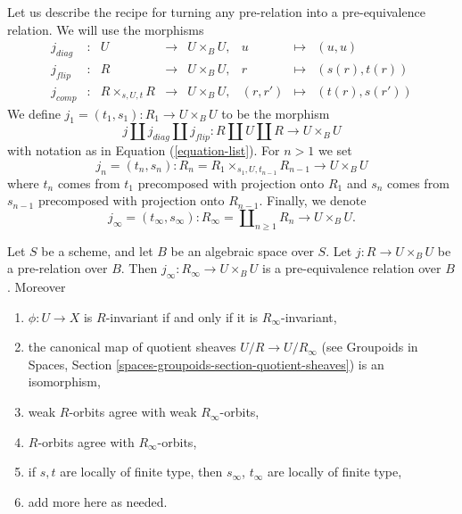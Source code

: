 \noindent
Let us describe the recipe for turning any pre-relation into a
pre-equivalence relation. We will use the morphisms
\begin{equation}
\label{equation-list}
\begin{matrix}
j_{diag} &
: &
U &
\longrightarrow &
U \times_B U, &
u &
\longmapsto &
(u, u) \\
j_{flip} &
: &
R &
\longrightarrow &
U \times_B U, &
r &
\longmapsto &
(s(r), t(r)) \\
j_{comp} &
: &
R \times_{s, U, t} R &
\longrightarrow &
U \times_B U, &
(r, r') &
\longmapsto &
(t(r), s(r'))
\end{matrix}
\end{equation}
We define $j_1 = (t_1, s_1) : R_1 \to U \times_B U$ to be the morphism
$$
j \amalg j_{diag} \amalg j_{flip} :
R \amalg U \amalg R
\longrightarrow
U \times_B U
$$
with notation as in
Equation (\ref{equation-list}).
For $n > 1$ we set
$$
j_n = (t_n, s_n) :
R_n = R_1 \times_{s_1, U, t_{n - 1}} R_{n - 1} \longrightarrow U \times_B U
$$
where $t_n$ comes from $t_1$ precomposed with projection onto $R_1$ and
$s_n$ comes from $s_{n - 1}$ precomposed with projection onto $R_{n - 1}$.
Finally, we denote
$$
j_\infty = (t_\infty, s_\infty) :
R_\infty = \coprod\nolimits_{n \geq 1} R_n
\longrightarrow
U \times_B U.
$$

\begin{lemma}
\label{lemma-make-pre-equivalence}
Let $S$ be a scheme, and let $B$ be an algebraic space over $S$.
Let $j : R \to U \times_B U$ be a pre-relation over $B$.
Then $j_\infty : R_\infty \to U \times_B U$ is a
pre-equivalence relation over $B$. Moreover
\begin{enumerate}
\item $\phi : U \to X$ is $R$-invariant if and only if it is
$R_\infty$-invariant,
\item the canonical map of quotient sheaves $U/R \to U/R_\infty$ (see
Groupoids in Spaces, Section \ref{spaces-groupoids-section-quotient-sheaves})
is an isomorphism,
\item weak $R$-orbits agree with weak $R_\infty$-orbits,
\item $R$-orbits agree with $R_\infty$-orbits,
\item if $s, t$ are locally of finite type, then $s_\infty$, $t_\infty$
are locally of finite type,
\item add more here as needed.
\end{enumerate}
\end{lemma}


